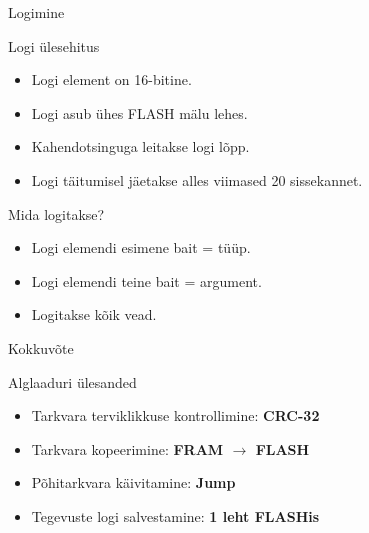 \documentclass[pdf,draft]{beamer}
\begin{document}
\begin{frame}{Logimine}
    \begin{block}{Logi ülesehitus}
        \begin{itemize}
            \item Logi element on 16-bitine.
            \item Logi asub ühes FLASH mälu lehes.
            \item Kahendotsinguga leitakse logi lõpp.
            \item Logi täitumisel jäetakse alles viimased 20 sissekannet.
        \end{itemize}
    \end{block}
    \begin{block}{Mida logitakse?}
        \begin{itemize}
            \item Logi elemendi esimene bait = tüüp.
            \item Logi elemendi teine bait = argument.
            \item Logitakse kõik vead.
        \end{itemize}
    \end{block}
\end{frame}

\begin{frame}{Kokkuvõte}
    \begin{block}{Alglaaduri ülesanded}
        \begin{itemize}
            \item Tarkvara terviklikkuse kontrollimine: \textbf{CRC-32}
            \item Tarkvara kopeerimine: \textbf{FRAM \(\to\) FLASH}
            \item Põhitarkvara käivitamine: \textbf{Jump}
            \item Tegevuste logi salvestamine: \textbf{1 leht FLASHis}
        \end{itemize}
    \end{block}
\end{frame}
\end{document}
